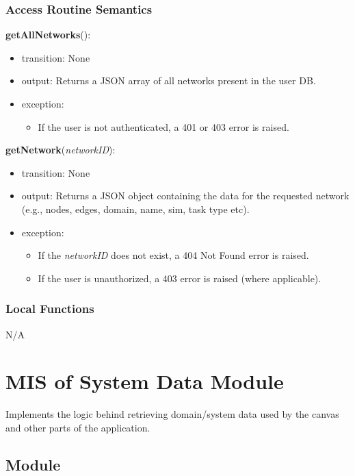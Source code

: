 \documentclass[12pt, titlepage]{article}
\begin{document}
\subsubsection{Access Routine Semantics}

\noindent \textbf{getAllNetworks}():
\begin{itemize}
\item transition: None
\item output: Returns a JSON array of all networks present in the user DB.
\item exception: 
  \begin{itemize}
    \item If the user is not authenticated, a 401 or 403 error is raised.
  \end{itemize}
\end{itemize}

\noindent \textbf{getNetwork}(\textit{networkID}):
\begin{itemize}
\item transition: None
\item output: Returns a JSON object containing the data for the requested network (e.g., nodes, edges, domain, name, sim, task type etc).
\item exception:
  \begin{itemize}
    \item If the \textit{networkID} does not exist, a 404 Not Found error is raised.
    \item If the user is unauthorized, a 403 error is raised (where applicable).
  \end{itemize}
\end{itemize}

\subsubsection{Local Functions}

N/A


\section{MIS of System Data Module} \label{mSystemMIS}
Implements the logic behind retrieving domain/system data used by the canvas and other parts of the application.

\subsection{Module}
\end{document}
